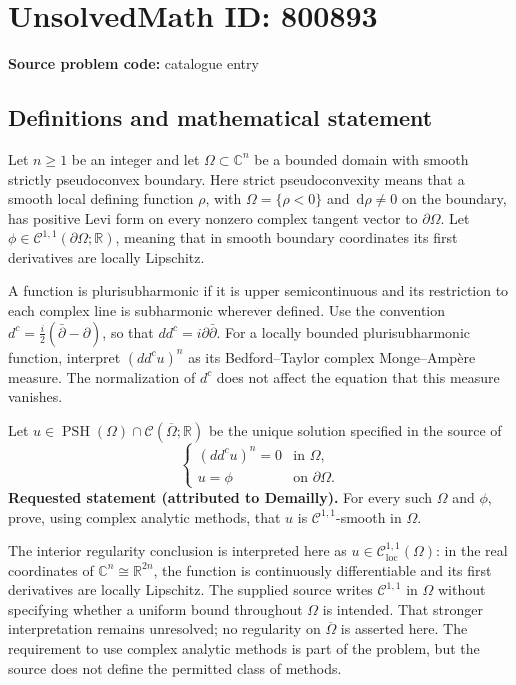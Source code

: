\documentclass[11pt]{article}
\newcommand{\R}{\mathbb{R}}
\newcommand{\C}{\mathbb{C}}
\newcommand{\dd}{\,\mathrm{d}}
\begin{document}
\section*{UnsolvedMath ID: 800893}
\textbf{Source problem code:} catalogue entry
\subsection{Definitions and mathematical statement}
Let \(n\geq 1\) be an integer and let \(\Omega\subset\C^n\) be a bounded domain with smooth strictly pseudoconvex boundary. Here strict pseudoconvexity means that a smooth local defining function \(\rho\), with \(\Omega=\{\rho<0\}\) and \(\dd\rho\ne0\) on the boundary, has positive Levi form on every nonzero complex tangent vector to \(\partial\Omega\). Let \(\phi\in\mathcal C^{1,1}(\partial\Omega;\R)\), meaning that in smooth boundary coordinates its first derivatives are locally Lipschitz.

A function is plurisubharmonic if it is upper semicontinuous and its restriction to each complex line is subharmonic wherever defined. Use the convention \(d^c=\frac{i}{2}(\bar\partial-\partial)\), so that \(dd^c=i\partial\bar\partial\). For a locally bounded plurisubharmonic function, interpret \((dd^c u)^n\) as its Bedford--Taylor complex Monge--Amp\`ere measure. The normalization of \(d^c\) does not affect the equation that this measure vanishes.

Let \(u\in\operatorname{PSH}(\Omega)\cap\mathcal C(\overline\Omega;\R)\) be the unique solution specified in the source of
\[
\begin{cases}
(dd^c u)^n=0 & \text{in }\Omega,\\
u=\phi & \text{on }\partial\Omega.
\end{cases}
\]
\textbf{Requested statement (attributed to Demailly).} For every such \(\Omega\) and \(\phi\), prove, using complex analytic methods, that \(u\) is \(\mathcal C^{1,1}\)-smooth in \(\Omega\).

The interior regularity conclusion is interpreted here as \(u\in\mathcal C^{1,1}_{\mathrm{loc}}(\Omega)\): in the real coordinates of \(\C^n\cong\R^{2n}\), the function is continuously differentiable and its first derivatives are locally Lipschitz. The supplied source writes \(\mathcal C^{1,1}\) in \(\Omega\) without specifying whether a uniform bound throughout \(\Omega\) is intended. That stronger interpretation remains unresolved; no regularity on \(\overline\Omega\) is asserted here. The requirement to use complex analytic methods is part of the problem, but the source does not define the permitted class of methods.
\end{document}

